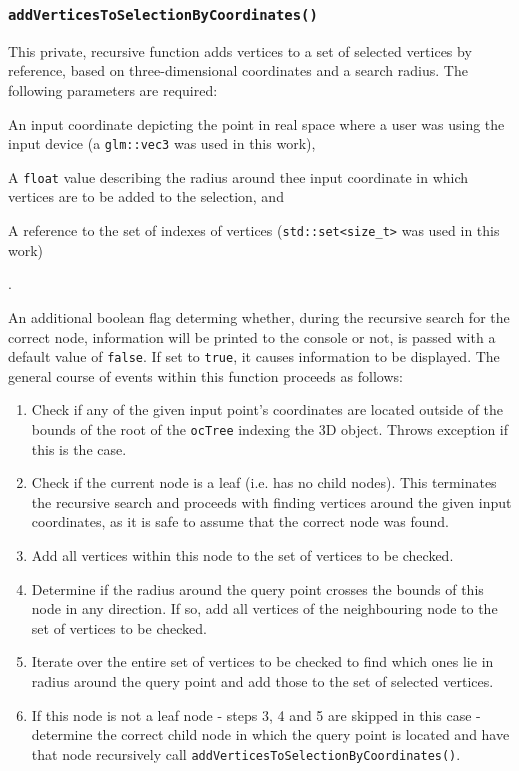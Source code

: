 	\subsubsection{\texttt{addVerticesToSelectionByCoordinates()}}
	\label{sec:addVerticesToSelectionByCoordinates()}
This private, recursive function adds vertices to a set of selected vertices by reference, based on three-dimensional coordinates and a search radius. The following parameters are required:
\begin{enumerate*}
	\item An input coordinate depicting the point in real space where a user was using the input device (a \texttt{glm::vec3} was used in this work),
	\item A \texttt{float} value describing the radius around thee input coordinate in which vertices are to be added to the selection, and
	\item A reference to the set of indexes of vertices (\texttt{std::set<size\_t>} was used in this work)
\end{enumerate*}.

An additional boolean flag determing whether, during the recursive search for the correct node, information will be printed to the console or not, is passed with a default value of \texttt{false}. If set to \texttt{true}, it causes information to be displayed. The general course of events within this function proceeds as follows:
\begin{enumerate}
	\item Check if any of the given input point's coordinates are located outside of the bounds of the root of the \texttt{ocTree} indexing the 3D object. Throws exception if this is the case.
	\item Check if the current node is a leaf (i.e. has no child nodes). This terminates the recursive search and proceeds with finding vertices around the given input coordinates, as it is safe to assume that the correct node was found.
	\item Add all vertices within this node to the set of vertices to be checked.
	\item Determine if the radius around the query point crosses the bounds of this node in any direction. If so, add all vertices of the neighbouring node to the set of vertices to be checked.
	\item Iterate over the entire set of vertices to be checked to find which ones lie in radius around the query point and add those to the set of selected vertices.
	\item If this node is not a leaf node - steps 3, 4 and 5 are skipped in this case - determine the correct child node in which the query point is located and have that node recursively call \texttt{addVerticesToSelectionByCoordinates()}.
\end{enumerate}

